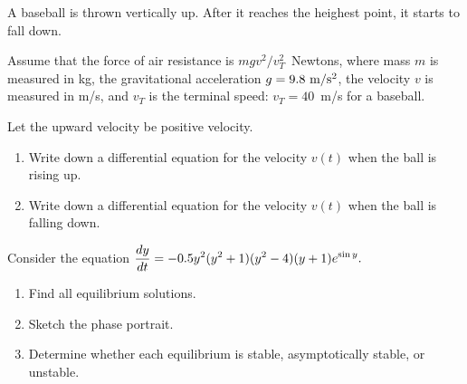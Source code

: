 \item 
A baseball is thrown vertically up. 
After it reaches the heighest
point, it starts to fall down.

Assume that the force of air resistance is 
$mgv^2/v_T^2$~Newtons, where mass $m$ is measured in kg, 
the gravitational acceleration $g=9.8~\mbox{\rm m}/\mbox{\rm s}^2$,
the velocity $v$ is measured in m/s,
and $v_T$ is the terminal speed: $v_T=40$~m/s for a baseball.

Let the upward velocity be positive velocity.

	\begin{enumerate}
	\item
Write down a differential equation for the velocity $v(t)$
when the ball is rising up.
	\item
Write down a differential equation for the velocity $v(t)$
when the ball is falling down.
	\end{enumerate}

\item
Consider the equation $\displaystyle {dy \over dt}= -0.5 y^2 (y^2+1) (y^2 -4)(y+1) e^{\sin y} .$
	\begin{enumerate}
	\item
Find all equilibrium solutions.
	\item
Sketch the phase portrait.
	\item
Determine whether each equilibrium is stable, asymptotically stable, or unstable.
	\end{enumerate} 

\def\one_dim_lin_approx{
\item
Consider the equation $\displaystyle {dy \over dt}= \frac{1}{16} (y+1)^3 (y-2)^2 (-y^3+y^2+6y).$
	\begin{enumerate}
	\item
Find all equilibrium solutions.
	\item
For each equilibrium point, write down the linear approximating equation near the equilibrium and determine whether the equilibrium is stable, asymptotically stable or unstable with respect to the linear approximating equation.
	\item 
Try to use the linear stability/instability obtained in (b) to determine whether each of the equilibria is stable, asymptotically stable or unstable with respect to the nonlinear equation $(*)$.
	\item
If the linear approximation obtained in (b) was not enough to determine the stability of an equilibrium with respect to the nonlinear equation $(*)$, use other methods to determine whether the equilibrium is stable, asymptotically stable or unstable with respect to the nonlinear equation $(*)$
	\item
Sketch the phase portrait for the nonlinear equation $(*)$.
	\end{enumerate}
}


